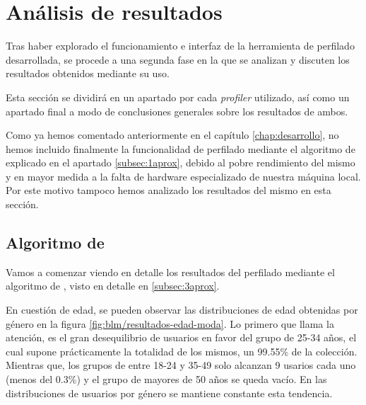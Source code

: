 \section{Análisis de resultados}

Tras haber explorado el funcionamiento e interfaz de la herramienta de perfilado desarrollada, se procede a una segunda fase en la que se analizan y discuten los resultados obtenidos mediante su uso.

Esta sección se dividirá en un apartado por cada \textit{profiler} utilizado, así como un apartado final a modo de conclusiones generales sobre los resultados de ambos.

Como ya hemos comentado anteriormente en el capítulo \ref{chap:desarrollo}, no hemos incluido finalmente la funcionalidad de perfilado mediante el algoritmo de \citet{loscalis22} explicado en el apartado \ref{subsec:1aprox}, debido al pobre rendimiento del mismo y en mayor medida a la falta de hardware especializado de nuestra máquina local. Por este motivo tampoco hemos analizado los resultados del mismo en esta sección.

\subsection{Algoritmo de \citet{modaresi:2016}}
Vamos a comenzar viendo en detalle los resultados del perfilado mediante el algoritmo de \cite{modaresi:2016}, visto en detalle en \ref{subsec:3aprox}.

En cuestión de edad, se pueden observar las distribuciones de edad obtenidas  por género en la figura \ref{fig:blm/resultados-edad-moda}. Lo primero que llama la atención, es el gran desequilibrio de usuarios en favor del grupo de 25-34 años, el cual supone prácticamente la totalidad de los mismos, un 99.55\% de la colección. Mientras que, los grupos de entre 18-24 y 35-49 solo alcanzan 9 usarios cada uno (menos del 0.3\%) y el grupo de mayores de 50 años se queda vacío. En las distribuciones de usuarios por género se mantiene constante esta tendencia.

